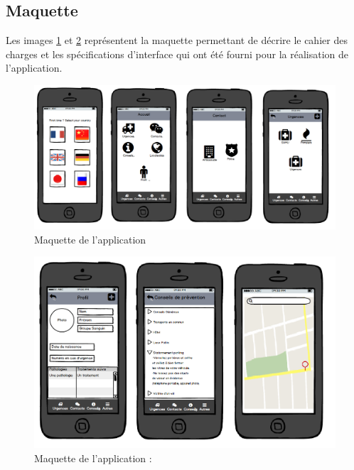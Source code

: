 \subsection{Maquette}

Les images \ref{maquette1} et \ref{maquette2} représentent la maquette permettant de décrire le cahier des charges et les spécifications d'interface qui ont été fourni pour la réalisation de l'application.

\begin{figure}[!h]
	\begin{center}
		\includegraphics[scale=0.45]{img/maquette1.png}
		\caption{Maquette de l'application}
		\label{maquette1} 
	\end{center}
\end{figure}

\begin{figure}[!h]
	\begin{center}
		
		\includegraphics[scale=0.5]{img/maquette2.png}
		\caption{Maquette de l'application : }
		\label{maquette2} 
		
	\end{center}
\end{figure}